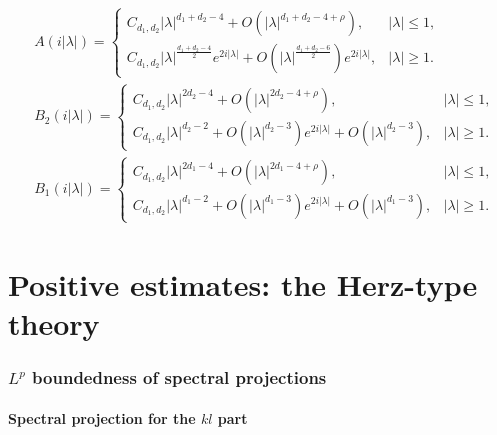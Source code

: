 \documentclass[12pt]{amsart}
\begin{document}
\begin{align*}
    &A(i|\lambda|) = \begin{cases}
        C_{d_1,d_2} |\lambda|^{d_1+d_2-4} + O\left(|\lambda|^{d_1+d_2-4+\rho} \right), & |\lambda|\le 1, \\
        C_{d_1,d_2} |\lambda|^{\frac{d_1+d_2-4}{2}} e^{2i|\lambda|} + O\left(|\lambda|^{\frac{d_1+d_2-6}{2}} \right) e^{2i|\lambda|}, & |\lambda|\ge 1.
    \end{cases}\\
    &B_2(i|\lambda|) = \begin{cases}
        C_{d_1,d_2} |\lambda|^{2d_2-4} + O\left(|\lambda|^{2d_2-4+\rho} \right), & |\lambda|\le 1, \\
        C_{d_1,d_2}|\lambda|^{d_2-2} + O\left(|\lambda|^{d_2-3}\right) e^{2i |\lambda|} + O\left(|\lambda|^{d_2-3}\right), & |\lambda|\ge 1.
    \end{cases}\\
    &B_1(i|\lambda|) = \begin{cases}
        C_{d_1,d_2} |\lambda|^{2d_1-4} + O\left(|\lambda|^{2d_1-4+\rho} \right), & |\lambda|\le 1, \\
        C_{d_1,d_2}|\lambda|^{d_1-2} + O\left(|\lambda|^{d_1-3}\right) e^{2i |\lambda|} + O\left(|\lambda|^{d_1-3}\right), & |\lambda|\ge 1.
    \end{cases}
\end{align*}



\part{Positive estimates: the Herz-type theory}


\section{\texorpdfstring{$L^p$}{Lp} boundedness of spectral projections}\label{sec3}

\subsection{Spectral projection for the \texorpdfstring{$kl$}{kl} part}
\end{document}
